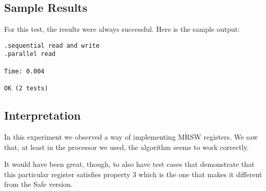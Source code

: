 \subsection{Sample Results}
\par
For this test, the results were always successful. Here is the sample output:
\begin{verbatim}
.sequential read and write
.parallel read

Time: 0.004

OK (2 tests)
\end{verbatim}
\par
\subsection{Interpretation}
\par
In this experiment we observed a way of implementing MRSW registers. We saw
that, at least in the processor we used, the algorithm seems to work correctly.
\par
It would have been great, though, to also have test cases that demonstrate that this
particular register satisfies property 3 which is the one that makes it
different from the Safe version.
